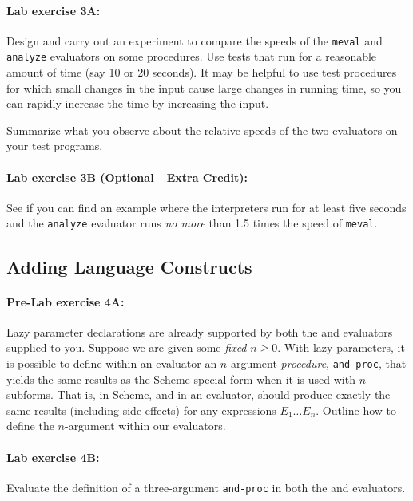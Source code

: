 \paragraph{Lab exercise 3A:} Design and carry out an experiment to
compare the speeds of the {\tt meval} and {\tt analyze} evaluators on some
procedures.  Use tests that run for a reasonable amount of time (say 10 or
20 seconds).  It may be helpful to use test procedures for which small
changes in the input cause large changes in running time, so you can
rapidly increase the time by increasing the input.

Summarize what you observe about the relative speeds of the two evaluators
on your test programs.

\paragraph{Lab exercise 3B (Optional---Extra Credit):}
See if you can find an example where the interpreters run for at least
five seconds and the {\tt analyze} evaluator runs {\em no more} than 1.5
times the speed of {\tt meval}.

\subsection{Adding Language Constructs}

\paragraph{Pre-Lab exercise 4A:}

Lazy parameter declarations are already supported by both the 
and  evaluators supplied to you.  Suppose we are given some
{\em fixed} $n \geq 0$.  With lazy parameters, it is possible to define
within an evaluator an $n$-argument {\em procedure}, {\tt and-proc}, that
yields the same results as the Scheme special form  when it is
used with $n$ subforms.  That is,  in
Scheme, and
 in an evaluator, should produce exactly the
same results (including side-effects) for any expressions $E_1 \ldots
E_n$.  Outline how to define the $n$-argument  within our
evaluators.

\paragraph{Lab exercise 4B:}
Evaluate the definition of a three-argument {\tt and-proc} in both the
 and  evaluators.

